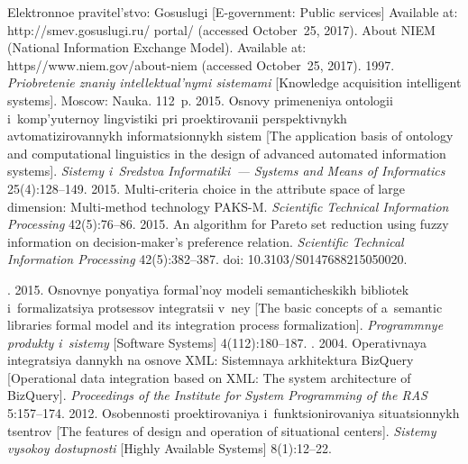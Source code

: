 \begin{multicols}{2}
{{\begin{thebibliography}{99}

Elektronnoe pravitel'stvo: Gosuslugi [E-government: Public services] Available at: {\sf 
http://smev.gosuslugi.ru/ portal/} (accessed October~25, 2017).
About NIEM (National Information Exchange Model).  Available at: {\sf 
https//www.niem.gov/about-niem} (accessed October~25, 2017).
 1997. \textit{Priobretenie znaniy intellektual'nymi sistemami} [Knowledge 
acquisition intelligent systems]. Moscow: Nauka. 112~p.
 2015. Osnovy 
primeneniya ontologii i~komp'yuternoy lingvistiki pri proektirovanii perspektivnykh 
avtomatizirovannykh informatsionnykh sistem [The application basis 
of ontology and 
computational linguistics in the design of advanced automated information systems]. 
\textit{Sistemy i~Sredstva Informatiki~--- Systems and Means of Informatics} 25(4):128--149.
 2015. Multi-criteria choice 
in the attribute space of large dimension: Multi-method technology PAKS-M. 
\textit{Scientific Technical Information Processing} 
42(5):76--86.
 2015. An algorithm for Pareto set reduction using 
fuzzy information on decision-maker's preference relation. 
\textit{Scientific Technical Information Processing} 42(5):382--387.
doi: 10.3103/S0147688215050020.

. 2015. Osnovnye ponyatiya formal'noy modeli 
semanticheskikh bibliotek i~formalizatsiya protsessov integratsii v~ney 
[The basic concepts of a~semantic libraries
formal model  and its integration process formalization]. 
\textit{Programmnye produkty i~sistemy} [Software Systems] 4(112):180--187.
. 2004. Operativnaya integratsiya dannykh na 
osnove XML: Sistemnaya arkhitektura BizQuery [Operational data integration based on XML: 
The system architecture of BizQuery]. \textit{Proceedings of the Institute for System Programming of the RAS} 
5:157--174.
 2012. Osobennosti 
proektirovaniya i~funktsionirovaniya si\-tu\-a\-tsi\-on\-nykh tsentrov [The features of design and 
operation of situational centers]. \textit{Sistemy vysokoy dostupnosti} 
[Highly Available Systems] 8(1):12--22.
\end{thebibliography}

 }
 }

\end{multicols}

